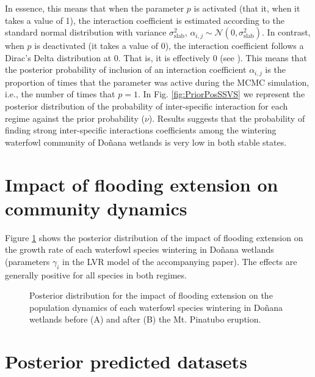 \documentclass[11pt]{article}
\begin{document}
{In essence, this means that when the parameter $p$ is activated (that it, when it takes a value of 1), the interaction coefficient is estimated according to the standard normal distribution with variance $\sigma^2_{\text{slab}}$, $\alpha_{i,j} \sim \mathcal{N} \left(0, \sigma^2_{\text{slab}} \right)$. In contrast, when $p$ is deactivated (it takes a value of 0), the interaction coefficient follows a Dirac's Delta distribution at 0. That is, it is effectively 0 (see \cite{Ishwaran2005}). This means that the posterior probability of inclusion of an interaction coefficient $\alpha_{i,j}$ is the proportion of times that the parameter was active during the MCMC simulation, i.e., the number of times that $p = 1$. In Fig. \ref{fig:PriorPosSSVS} we represent the posterior distribution of the probability of inter-specific interaction for each regime against the prior probability ($\nu$). Results suggests that the probability of finding strong inter-specific interactions coefficients among the wintering waterfowl community of Doñana wetlands is very low in both stable states.\\

\section{Impact of flooding extension on community dynamics}

Figure \ref{fig:FloodingImpact} shows the posterior distribution of the impact of flooding extension on the growth rate of each waterfowl species wintering in Doñana wetlands (parameters $\gamma_{i}$ in the LVR model of the accompanying paper). The effects are generally positive for all species in both regimes.\\

\renewcommand{\thefigure}{S2}
\begin{figure}[t]
	\centering
	\qquad
	\caption{Posterior distribution for the impact of flooding extension on the population dynamics of each waterfowl species wintering in Doñana wetlands before (A) and after (B) the Mt. Pinatubo eruption.}%
	\label{fig:FloodingImpact}%
\end{figure}

\section{Posterior predicted datasets}

}
\end{document}
